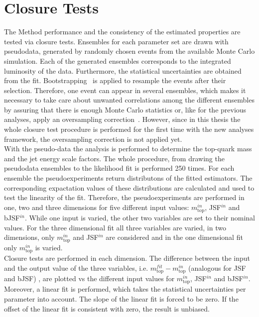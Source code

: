 {{{\section{Closure Tests}\label{ct}
The Method performance and the consistency of the estimated properties are tested via closure tests. Ensembles for each parameter set are drawn with pseudodata, generated by randomly chosen events from the available Monte Carlo simulation. Each of the generated ensembles corresponds to the integrated luminosity of the data. Furthermore, the statistical uncertainties are obtained from the fit. Bootstrapping~\cite{efron1992bootstrap} is applied to resample the events after their selection. Therefore, one event can appear in several ensembles, which makes it necessary to take care about unwanted correlations among the different ensembles by assuring that there is enough Monte Carlo statistics or, like for the previous analyses, apply an oversampling correction~\cite{barlow2000application}. 
However, since in this thesis the whole closure test procedure is performed for the first time with the new analyses framework, the oversampling correction is not applied yet.  \\

 \noindent With the pseudo-data the  analysis is performed to determine the top-quark mass and the jet energy scale factors. The whole procedure, from drawing the pseudodata ensembles to the likelihood fit is performed 250 times. 
 For each ensemble the pseudoexperiments return distributons of the fitted estimators. The corresponding expactation values of these distributions are calculated and used to test the linearity of the fit. Therefore, the pseudoexperiments are performed in one, two and three dimensions for five different input values: $m_{\text{top}}^{in}$, JSF$^{in}$ and bJSF$^{in}$. While one input is varied, the other two variables are set to their nominal values. 
For the three dimensional fit all three variables are varied, in two dimensions, only $m_{\text{top}}^{in}$ and JSF$^{in}$ are considered and in the one dimensional fit only  $m_{\text{top}}^{in}$ is varied. \\
  
 \noindent  Closure tests are performed in each dimension. The difference between the input and the output value of the three variables, i.e.  $m_{\text{top}}^{fit}-m_{\text{top}}^{in}$  (analogous for JSF and bJSF) , are  plotted vs the different input values for $m_{\text{top}}^{in}$, JSF$^{in}$ and bJSF$^{in}$. Moreover,  a linear fit is performed, which takes the statistical uncertainties per parameter into account. The slope of the linear fit is forced to be zero. If the offset of the linear fit is consistent with zero, the result is unbiased.\\
 
}}}
